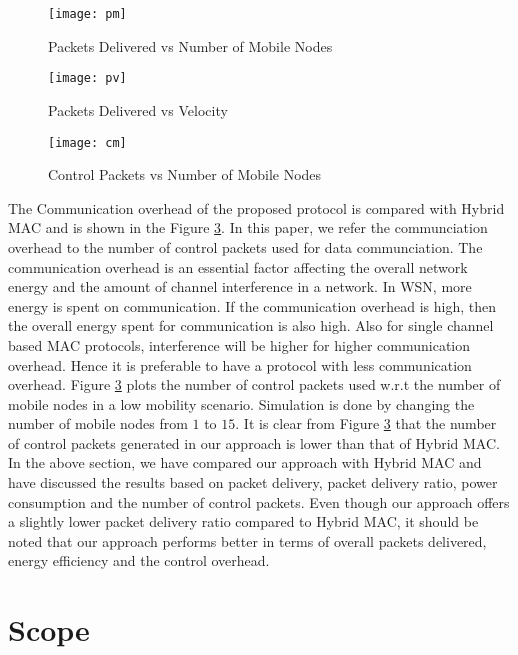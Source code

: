 \begin{figure}[h]{} 
  \begin{center}
		\texttt{[image: pm]}
  \end{center}
	\caption{Packets Delivered vs Number of Mobile Nodes}
		\label{fig:pm}
\end{figure}

\begin{figure}[h]{} 
  \begin{center}
		\texttt{[image: pv]}
  \end{center}
	\caption{Packets Delivered vs Velocity}
		\label{fig:pv}
\end{figure}
 
\begin{figure}[h]{} 
  \begin{center}
		\texttt{[image: cm]}
  \end{center}
	\caption{Control Packets vs Number of Mobile Nodes}
		\label{fig:cm}
\end{figure}


The Communication overhead of the proposed protocol is compared with Hybrid MAC and is shown in the Figure \ref{fig:cm}. In this paper, we refer the communciation overhead to the number of control packets used for data communciation. The communication overhead is an essential factor affecting the overall network energy and the amount of channel interference in a network.  In WSN, more energy is spent on communication. If the communication overhead is high, then the overall energy spent for communication is also high. Also for single channel based MAC protocols, interference will be higher for higher communication overhead. Hence it is preferable to have a protocol with less communication overhead. Figure  \ref{fig:cm} plots the number of control packets used w.r.t the number of mobile nodes in a low mobility scenario. Simulation is done by changing the number of mobile nodes from $1$ to $15$. It is clear from Figure \ref{fig:cm} that the number of control packets generated in our approach is lower than that of Hybrid MAC.\\

In the above section, we have compared our approach with Hybrid MAC and have discussed the results based on packet delivery, packet delivery ratio, power consumption and the number of control packets. Even though our approach offers a slightly lower packet delivery ratio compared to Hybrid MAC, it should be noted that our approach performs better in terms of overall packets delivered, energy efficiency and the control overhead. 


\section{Scope}
